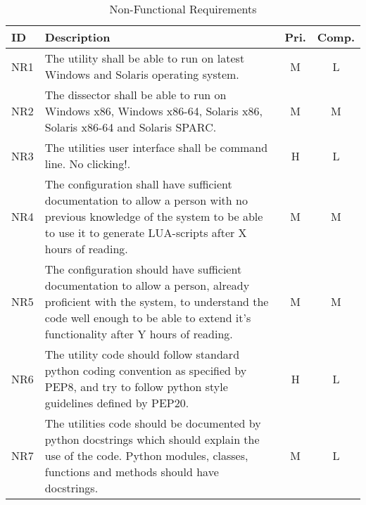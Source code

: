 \begin{table}[ht] \footnotesize \center
\caption{Non-Functional Requirements\label{tab:nonfuncreq}}
\begin{tabularx}{\textwidth}{l X c c}
	\toprule
	ID & Description & Pri. & Comp. \\
	\midrule
	NR1 & The utility shall be able to run on latest Windows and Solaris
		operating system.
		& M & L \\
	NR2 & The dissector shall be able to run on Windows x86, Windows x86-64,
		Solaris x86, Solaris x86-64 and Solaris SPARC.
		& M & M \\
	NR3 & The utilities user interface shall be command line. No clicking!.
		& H & L \\
	NR4 & The configuration shall have sufficient documentation to allow a
		person with no previous knowledge of the system to be able to use it
		to generate LUA-scripts after X hours of reading.
		& M & M \\
	NR5 & The configuration should have sufficient documentation to allow a
		person, already proficient with the system, to understand the code
		well enough to be able to extend it’s functionality after Y hours of
		reading.
		& M & M \\
	NR6 & The utility code should follow standard python coding convention as
		specified by PEP8, and try to follow python style guidelines defined
		by PEP20.
		& H & L \\
	NR7 & The utilities code should be documented by python docstrings which
		should explain the use of the code. Python modules, classes, functions
		and methods should have docstrings.
		& M & L \\
	\bottomrule
\end{tabularx}
\end{table}

